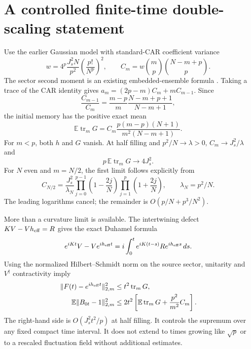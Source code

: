 \documentclass[11pt,a4paper]{article}
\newcommand{\EE}{\mathbb E}
\newcommand{\trm}{\operatorname{tr}_m}
\begin{document}
\newpage
\section{A controlled finite-time double-scaling statement}
Use the earlier Gaussian model with standard-CAR coefficient variance
\begin{equation}
 w=4^p\frac{J_s^2N}{p^2}\left(\frac{p!}{N^p}\right)^2,
 \qquad C_m=w\binom mp\binom{N-m+p}{p}.
\end{equation}
The sector second moment is an existing embedded-ensemble formula
\cite{Tall}. Taking a trace of the CAR identity gives
$a_m=(2p-m)C_m+mC_{m-1}$. Since
\begin{equation}
 \frac{C_{m-1}}{C_m}=\frac{m-p}{m}\frac{N-m+p+1}{N-m+1},
\end{equation}
the initial memory has the positive exact mean
\begin{equation}\label{eq:mean}
 \EE\trm G=C_m\frac{p(m-p)(N+1)}{m^2(N-m+1)}.
\end{equation}
For $m<p$, both $h$ and $G$ vanish. At half filling and
$p^2/N\to\lambda>0$, $C_m\to J_s^2/\lambda$ and
\begin{equation}
 p\,\EE\trm G\longrightarrow4J_s^2.
\end{equation}
For $N$ even and $m=N/2$, the first limit follows explicitly from
\begin{equation}
 C_{N/2}=\frac{J_s^2}{\lambda_N}
 \prod_{j=0}^{p-1}\left(1-\frac{2j}N\right)
 \prod_{j=1}^{p}\left(1+\frac{2j}N\right),\qquad
 \lambda_N=p^2/N.
\end{equation}
The leading logarithms cancel; the remainder is
$O(p/N+p^3/N^2)$.

More than a curvature limit is available. The intertwining defect
$KV-Vh_{\rm eff}=R$ gives the exact Duhamel formula
\begin{equation}
 e^{iKt}V-Ve^{ih_{\rm eff}t}
 =i\int_0^t e^{iK(t-s)}R e^{ih_{\rm eff}s}\,ds.
\end{equation}
Using the normalized Hilbert--Schmidt norm on the source sector,
unitarity and $V^\dagger$ contractivity imply
\begin{align}
 \|F(t)-e^{ih_{\rm eff}t}\|_{2,m}^2&\leq t^2\trm G,\\
 \EE\|B_{0t}-1\|_{2,m}^2
 &\leq2t^2\left[\EE\trm G+\frac{p^2}{m^2}C_m\right].\label{eq:bound}
\end{align}
The right-hand side is $O(J_s^2t^2/p)$ at half filling. It controls
the supremum over any fixed compact time interval. It does not extend
to times growing like $\sqrt p$ or to a rescaled fluctuation field
without additional estimates.
\end{document}
